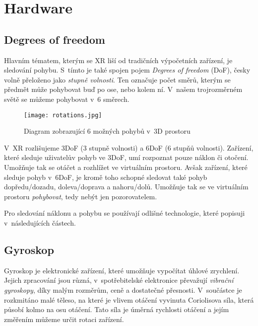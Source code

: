 \chapter{Hardware}

\section{Degrees of freedom}

Hlavním tématem, kterým se XR liší od tradičních výpočetních zařízení, je sledování pohybu. S~tímto je také spojen pojem \textit{Degrees of freedom} (DoF), česky volně přeloženo jako \textit{stupně volnosti}. Ten označuje počet směrů, kterým se předmět může pohybovat \poml buď po ose, nebo kolem ní. V~našem trojrozměrném světě se můžeme pohybovat v~6 směrech. \cite{mechatech_3dof_6dof}

\begin{figure}[H]
    \centering
    \texttt{[image: rotations.jpg]}
    \caption{Diagram zobrazující 6 možných pohybů v~3D prostoru \cite{nasa_aircraft}}
    \label{rotations_nasa_fig}
\end{figure}

V~XR rozlišujeme 3DoF (3 stupně volnosti) a 6DoF (6 stupňů volnosti). Zařízení, které sleduje uživatelův pohyb ve 3DoF, umí rozpoznat pouze náklon či otočení. Umožňuje tak se otáčet a rozhlížet ve virtuálním prostoru. Avšak zařízení, které sleduje pohyb v~6DoF, je kromě toho schopné sledovat také pohyb dopředu/dozadu, doleva/doprava a nahoru/dolů. Umožňuje tak se ve virtuálním prostoru \textit{pohybovat}, tedy nebýt jen pozorovatelem. \cite{mechatech_3dof_6dof}

Pro sledování náklonu a pohybu se používají odlišné technologie, které popisuji v~následujících částech.

\section{Gyroskop}

Gyroskop je elektronické zařízení, které umožňuje vypočítat úhlové zrychlení. Jejich zpracování jsou různá, v~spotřebitelské elektronice převažují \textit{vibrační gyroskopy}, díky malým rozměrům, ceně a dostatečné přesnosti. V~součástce je rozkmitáno malé těleso, na které je vlivem otáčení vyvinuta Coriolisova síla, která působí kolmo na osu otáčení. Tato síla je úměrná rychlosti otáčení a jejím změřením můžeme určit rotaci zařízení. \cite{Electricity_Magnetism} \cite{techmania_coriolis}

